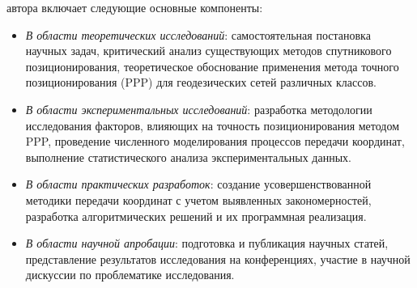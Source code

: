{\contribution} автора включает следующие основные компоненты:
\begin{itemize}
	\item \textit{В области теоретических исследований}:  самостоятельная постановка научных задач, критический анализ существующих методов спутникового позиционирования, теоретическое обоснование применения метода точного позиционирования (PPP) для геодезических сетей различных классов.
	\item \textit{В области экспериментальных исследований}:  разработка методологии исследования факторов, влияющих на точность позиционирования методом PPP, проведение численного моделирования процессов передачи координат, выполнение статистического анализа экспериментальных данных.
	\item \textit{В области практических разработок}: создание усовершенствованной методики передачи координат с учетом выявленных закономерностей, разработка алгоритмических решений и их программная реализация.
	\item \textit{В области научной апробации}: подготовка и публикация научных статей, представление результатов исследования на конференциях, участие в научной дискуссии по проблематике исследования.
\end{itemize}
